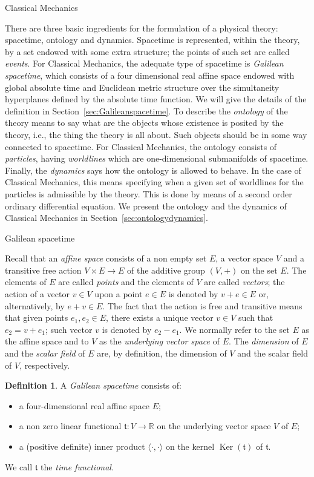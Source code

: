 \documentclass[oneside,a4paper,11pt]{amsbook}
\newcommand{\R}{\mathds R}
\DeclareMathOperator{\Ker}{Ker}
\theoremstyle{remark}\newtheorem{exercise}{Exercise}[chapter]
\theoremstyle{plain}\newtheorem{teo}{Theorem}[section]
\theoremstyle{plain}\newtheorem{lem}[teo]{Lemma}
\theoremstyle{plain}\newtheorem{prop}[teo]{Proposition}
\theoremstyle{plain}\newtheorem{cor}[teo]{Corollary}
\theoremstyle{definition}\newtheorem{defin}[teo]{Definition}
\theoremstyle{remark}\newtheorem{rem}[teo]{Remark}
\theoremstyle{definition}\newtheorem{notation}[teo]{Notation}
\theoremstyle{definition}\newtheorem{convention}[teo]{Convention}
\theoremstyle{definition}\newtheorem{example}[teo]{Example}
\numberwithin{section}{chapter}
\numberwithin{equation}{section}
\begin{document}
\begin{chapter}{Classical Mechanics}

There are three basic ingredients for the formulation of a physical theory: spacetime, ontology and dynamics.
Spacetime is represented, within the theory, by a set endowed with some extra structure; the points of such
set are called {\em events}. For Classical Mechanics, the adequate type of spacetime is {\em Galilean spacetime},
which consists of a four dimensional real affine space endowed with global absolute time and Euclidean
metric structure over the simultaneity hyperplanes defined by the absolute time function. We will give the details
of the definition in Section~\ref{sec:Galileanspacetime}. To describe the {\em ontology\/} of the theory means
to say what are the objects whose existence is posited by the theory, i.e., the thing the theory is all about.
Such objects should be in some way connected to spacetime. For Classical Mechanics, the ontology consists of
{\em particles}, having {\em worldlines\/} which are one-dimensional submanifolds of spacetime. Finally, the
{\em dynamics\/} says how the ontology is allowed to behave. In the case of Classical Mechanics,
this means specifying when a given set of worldlines for the particles is admissible by the theory. This is done
by means of a second order ordinary differential equation. We present the ontology and
the dynamics of Classical Mechanics in Section~\ref{sec:ontologydynamics}.

\begin{section}{Galilean spacetime}
\label{sec:Galileanspacetime}

Recall that an {\em affine space\/} consists of a non empty set $E$, a vector space $V$ and a transitive free action
$V\times E\to E$ of the additive group $(V,+)$ on the set $E$. The elements of $E$ are called {\em points\/}
and the elements of $V$ are called {\em vectors}; the action of a vector $v\in V$ upon a point $e\in E$ is denoted
by $v+e\in E$ or, alternatively, by $e+v\in E$. The fact that the action is free and transitive means that given
points $e_1,e_2\in E$, there exists a unique vector $v\in V$ such that $e_2=v+e_1$; such vector $v$ is denoted by
$e_2-e_1$. We normally refer to the set $E$ as the affine space and to $V$ as the {\em underlying vector space\/} of $E$.
The {\em dimension\/} of $E$ and the {\em scalar field\/} of $E$ are, by definition, the dimension of $V$ and
the scalar field of $V$, respectively.

\begin{defin}
A {\em Galilean spacetime\/} consists of:
\begin{itemize}
\item a four-dimensional real affine space $E$;
\item a non zero linear functional $\mathfrak t:V\to\R$ on the underlying vector space $V$ of $E$;
\item a (positive definite) inner product $\langle\cdot,\cdot\rangle$ on the kernel $\Ker(\mathfrak t)$ of $\mathfrak t$.
\end{itemize}
We call $\mathfrak t$ the {\em time functional}.
\end{defin}


\end{section}
\end{chapter}
\end{document}
